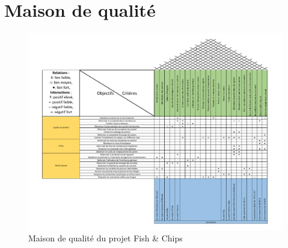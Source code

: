 

\newpage


\section{Maison de qualité}

\begin{figure}[htb!]
    \centering
    \includegraphics[width=\linewidth]{fig/MQ3.pdf}
    \caption{Maison de qualité du projet Fish \& Chips}
    \label{fig:maison_qualite}
\end{figure}
